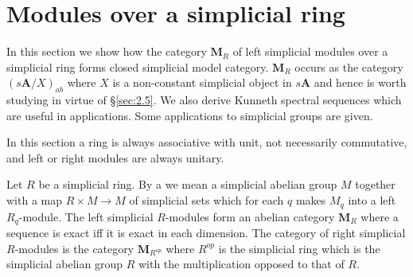 \documentclass[../main]{subfiles}
\begin{document}
\section{Modules over a simplicial ring}\label{sec:2.6}
In this section we show how the category $\mathbf{M}_R$ of left simplicial modules over a simplicial ring forms closed simplicial model category. $\mathbf{M}_R$ occurs as the category $(s\mathbf{A}/X)_{ab}$ where $X$ is a non-constant simplicial object in $s\mathbf{A}$ and hence is worth studying in virtue of \S\ref{sec:2.5}. We also derive Kunneth spectral sequences which are useful in applications. Some applications to simplicial groups are given.

In this section a ring is always associative with unit, not necessarily commutative, and left or right modules are always unitary.

Let $R$ be a simplicial ring. By a  we mean a simplicial abelian group $M$ together with a map $R\times M\longrightarrow M$ of simplicial sets which for each $q$ makes $M_q$ into a left $R_q$-module. The left simplicial $R$-modules form an abelian category $\mathbf{M}_R$ where a sequence is exact iff it is exact in each dimension. The category of right simplicial $R$-modules is the category $\mathbf{M}_{R^{op}}$ where $R^{op}$ is the simplicial ring which is the simplicial abelian group $R$ with the multiplication opposed to that of $R$.
\end{document}
